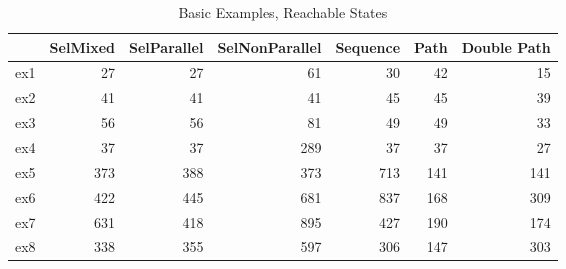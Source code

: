 \begin{table}
\centering
\caption{Basic Examples, Reachable States}
\label{b_e_reach}
\begin{tabular}{lrrrrrr}
\toprule
{} &  SelMixed &  SelParallel &  SelNonParallel &  Sequence &  Path &  Double Path \\
\midrule
ex1 &        27 &           27 &              61 &        30 &    42 &           15 \\
ex2 &        41 &           41 &              41 &        45 &    45 &           39 \\
ex3 &        56 &           56 &              81 &        49 &    49 &           33 \\
ex4 &        37 &           37 &             289 &        37 &    37 &           27 \\
ex5 &       373 &          388 &             373 &       713 &   141 &          141 \\
ex6 &       422 &          445 &             681 &       837 &   168 &          309 \\
ex7 &       631 &          418 &             895 &       427 &   190 &          174 \\
ex8 &       338 &          355 &             597 &       306 &   147 &          303 \\
\bottomrule
\end{tabular}
\end{table}
